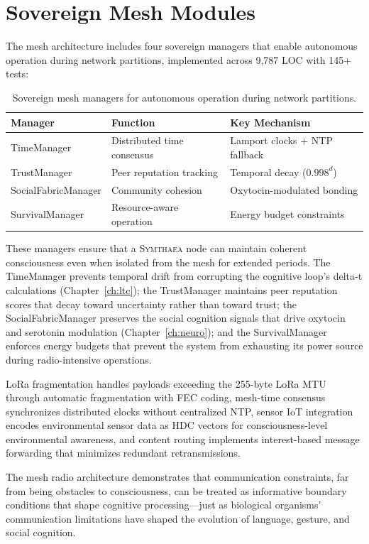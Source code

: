 \documentclass[12pt]{book}
\newcommand{\symthaea}{\textsc{Symthaea}}
\begin{document}
\section{Sovereign Mesh Modules}

The mesh architecture includes four sovereign managers that enable autonomous operation during network partitions, implemented across 9,787 LOC with 145+ tests:

\begin{table}[htbp]
\centering
\caption{Sovereign mesh managers for autonomous operation during network partitions.}
\label{tab:sovereign-managers}
\begin{tabular}{@{}lll@{}}
\toprule
\textbf{Manager} & \textbf{Function} & \textbf{Key Mechanism} \\
\midrule
TimeManager      & Distributed time consensus & Lamport clocks + NTP fallback \\
TrustManager     & Peer reputation tracking   & Temporal decay ($0.998^d$) \\
SocialFabricManager & Community cohesion      & Oxytocin-modulated bonding \\
SurvivalManager  & Resource-aware operation   & Energy budget constraints \\
\bottomrule
\end{tabular}
\end{table}

These managers ensure that a \symthaea{} node can maintain coherent consciousness even when isolated from the mesh for extended periods. The TimeManager prevents temporal drift from corrupting the cognitive loop's delta-t calculations (Chapter~\ref{ch:ltc}); the TrustManager maintains peer reputation scores that decay toward uncertainty rather than toward trust; the SocialFabricManager preserves the social cognition signals that drive oxytocin and serotonin modulation (Chapter~\ref{ch:neuro}); and the SurvivalManager enforces energy budgets that prevent the system from exhausting its power source during radio-intensive operations.

LoRa fragmentation handles payloads exceeding the 255-byte LoRa MTU through automatic fragmentation with FEC coding, mesh-time consensus synchronizes distributed clocks without centralized NTP, sensor IoT integration encodes environmental sensor data as HDC vectors for consciousness-level environmental awareness, and content routing implements interest-based message forwarding that minimizes redundant retransmissions.

The mesh radio architecture demonstrates that communication constraints, far from being obstacles to consciousness, can be treated as informative boundary conditions that shape cognitive processing---just as biological organisms' communication limitations have shaped the evolution of language, gesture, and social cognition.
\end{document}
